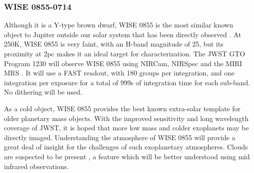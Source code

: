 \subsubsection{WISE 0855-0714}
Although it is a Y-type brown dwarf, WISE 0855 is the most similar known object to Jupiter outside our solar system that has been directly observed \parencite{Luhman2014}. 
At 250K, WISE 0855 is very faint, with an H-band magnitude of 25, but its proximity at 2pc makes it an ideal target for characterization.
The JWST GTO Program 1230 will observe WISE 0855 using NIRCam, NIRSpec and the MIRI MRS \parencite{Oliveira2019}.
It will use a FAST readout, with 180 groups per integration, and one integration per exposure for a total of 999s of integration time for each sub-band. No dithering will be used.

As a cold object, WISE 0855 provides the best known extra-solar template for older planetary mass objects.
With the improved sensitivity and long wavelength coverage of JWST, it is hoped that more low mass and colder exoplanets may be directly imaged.
Understanding the atmosphere of WISE 0855 will provide a great deal of insight for the challenges of such exoplanetary atmospheres. 
Clouds are suspected to be present \parencite{Faherty2018}, a feature which will be better understood using mid infrared observations.

